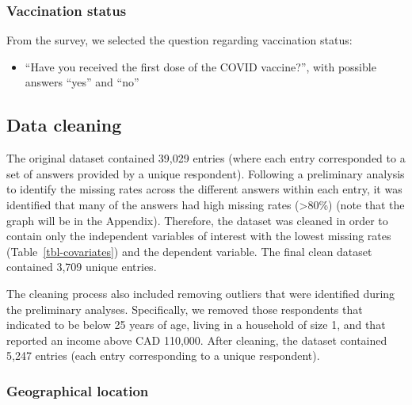 \documentclass[
  letterpaper,
  DIV=11,
  numbers=noendperiod]{scrartcl}
\providecommand{\tightlist}{%
  \setlength{\itemsep}{0pt}\setlength{\parskip}{0pt}}\usepackage{longtable,booktabs,array}
\begin{document}
\hypertarget{vaccination-status}{%
\subsubsection{Vaccination status}\label{vaccination-status}}

From the survey, we selected the question regarding vaccination status:

\begin{itemize}
\tightlist
\item
  ``Have you received the first dose of the COVID vaccine?'', with
  possible answers ``yes'' and ``no''
\end{itemize}

\hypertarget{data-cleaning}{%
\subsection{Data cleaning}\label{data-cleaning}}

The original dataset contained 39,029 entries (where each entry
corresponded to a set of answers provided by a unique respondent).
Following a preliminary analysis to identify the missing rates across
the different answers within each entry, it was identified that many of
the answers had high missing rates (\textgreater80\%) (note that the
graph will be in the Appendix). Therefore, the dataset was cleaned in
order to contain only the independent variables of interest with the
lowest missing rates (Table~\ref{tbl-covariates}) and the dependent
variable. The final clean dataset contained 3,709 unique entries.

The cleaning process also included removing outliers that were
identified during the preliminary analyses. Specifically, we removed
those respondents that indicated to be below 25 years of age, living in
a household of size 1, and that reported an income above CAD 110,000.
After cleaning, the dataset contained 5,247 entries (each entry
corresponding to a unique respondent).

\hypertarget{sec-geographical-location}{%
\subsubsection{Geographical location}\label{sec-geographical-location}}
\end{document}
